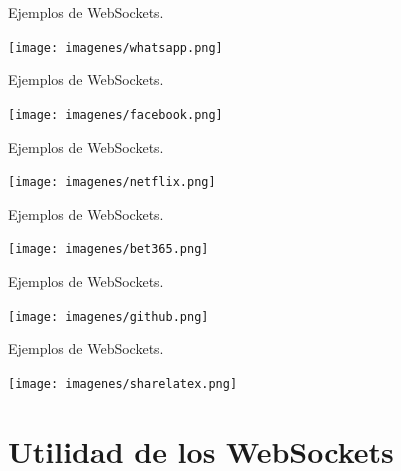 \documentclass[usenames,dvipsnames]{beamer}
\begin{document}
\begin{frame}{Ejemplos de WebSockets.}


	\begin{center}
	\texttt{[image: imagenes/whatsapp.png]}
	\end{center}

\end{frame}

\begin{frame}{Ejemplos de WebSockets.}


	\begin{center}
	\texttt{[image: imagenes/facebook.png]}
	\end{center}

\end{frame}

\begin{frame}{Ejemplos de WebSockets.}


	\begin{center}
	\texttt{[image: imagenes/netflix.png]}
	\end{center}

\end{frame}

\begin{frame}{Ejemplos de WebSockets.}


	\begin{center}
	\texttt{[image: imagenes/bet365.png]}
	\end{center}

\end{frame}

\begin{frame}{Ejemplos de WebSockets.}


	\begin{center}
	\texttt{[image: imagenes/github.png]}
	\end{center}

\end{frame}

\begin{frame}{Ejemplos de WebSockets.}


	\begin{center}
	\texttt{[image: imagenes/sharelatex.png]}
	\end{center}

\end{frame}

\section{Utilidad de los WebSockets}
\end{document}
